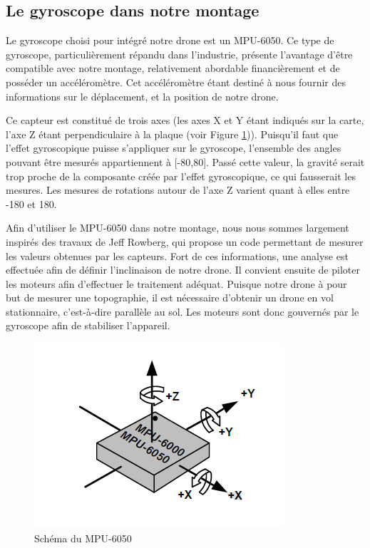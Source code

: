\documentclass[a4paper,10pt]{report}
\begin{document}
	\subsection{Le gyroscope dans notre montage}
	  Le gyroscope choisi pour intégré notre drone est un MPU-6050. Ce type 
de gyroscope, particulièrement répandu dans l'industrie, présente l'avantage 
d'être compatible avec notre montage, relativement abordable financièrement et 
de posséder un accéléromètre. Cet accéléromètre étant destiné à nous fournir 
des informations sur le déplacement, et la position de notre drone. 
 
	  Ce capteur est constitué de trois axes (les axes X et Y étant 
indiqués sur la carte, l'axe Z étant perpendiculaire à la plaque (voir 
Figure \ref{mpu6050schema})). Puisqu'il faut que l'effet gyroscopique puisse 
s'appliquer sur le gyroscope, l'ensemble des angles pouvant être mesurés 
appartiennent à [-80,80]. Passé cette valeur, la gravité serait trop proche de 
la composante créée par l'effet gyroscopique, ce qui fausserait les mesures. 
Les mesures de rotations autour de l'axe Z varient quant à elles entre -180 et 
180.

	  Afin d'utiliser le MPU-6050 dans notre montage, nous nous sommes 
largement inspirés des travaux de Jeff Rowberg\cite{jeffrwork}, qui propose un 
code permettant de mesurer les valeurs obtenues par les capteurs. Fort de ces 
informations, une analyse est effectuée afin de définir l'inclinaison de notre 
drone. Il convient ensuite de piloter les moteurs afin d'effectuer le 
traitement adéquat. Puisque notre drone à pour but de mesurer une topographie, 
il est nécessaire d'obtenir un drone en vol stationnaire, c'est-à-dire 
parallèle au sol. Les moteurs sont donc gouvernés par le gyroscope afin de 
stabiliser l'appareil.

	  \begin{figure}[htbp]
	    \centering
	    \includegraphics[scale = 0.6]{img/MPU6050_schema.png}
	    \caption{Schéma du MPU-6050}
	    \label{mpu6050schema}
	  \end{figure}
	  
\end{document}
